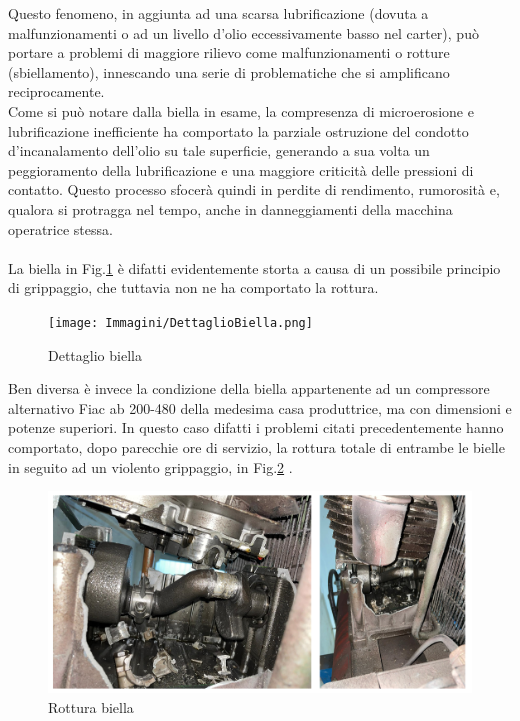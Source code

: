 Questo fenomeno, in aggiunta ad una scarsa lubrificazione (dovuta a malfunzionamenti o ad un livello d’olio eccessivamente basso nel carter), può portare a problemi di maggiore rilievo come malfunzionamenti o rotture (sbiellamento), innescando una serie di problematiche che si amplificano reciprocamente.\\
Come si può notare dalla biella in esame, la compresenza di microerosione e lubrificazione inefficiente ha comportato la parziale ostruzione del condotto d’incanalamento dell’olio su tale superficie, generando a sua volta un peggioramento della lubrificazione e una maggiore criticità delle pressioni di contatto. Questo processo sfocerà quindi in perdite di rendimento, rumorosità e, qualora si protragga nel tempo, anche in danneggiamenti della macchina operatrice stessa.\\
\\
La biella in Fig.\ref{fig:DettaglioBiella} è difatti evidentemente storta a causa di un possibile principio di grippaggio, che tuttavia non ne ha comportato la rottura.
\begin{figure}[h]
    \centering
    \texttt{[image: Immagini/DettaglioBiella.png]}
    \caption{Dettaglio biella}
    \label{fig:DettaglioBiella}
\end{figure}

Ben diversa è invece la condizione della biella appartenente ad un compressore alternativo Fiac ab 200-480 della medesima casa produttrice, ma con dimensioni e potenze superiori. In questo caso difatti i problemi citati precedentemente hanno comportato, dopo parecchie ore di servizio, la rottura totale di entrambe le bielle in seguito ad un violento grippaggio, in Fig.\ref{fig:Sbiellamento} .  
\begin{figure}[h]
    \centering
    \includegraphics[scale=0.35]{Immagini/Sbiellamento.png}
    \caption{Rottura biella}
    \label{fig:Sbiellamento}
\end{figure}
\newpage
